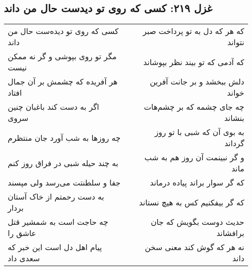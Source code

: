 \begin{center}
\section*{غزل ۲۱۹: کسی که روی تو دیدست حال من داند}
\label{sec:219}
\begin{longtable}{l p{0.5cm} r}
کسی که روی تو دیده‌ست حال من داند
&&
که هر که دل به تو پرداخت صبر نتواند
\\
مگر تو روی بپوشی و گر نه ممکن نیست
&&
که آدمی که تو بیند نظر بپوشاند
\\
هر آفریده که چشمش بر آن جمال افتاد
&&
دلش ببخشد و بر جانت آفرین خواند
\\
اگر به دست کند باغبان چنین سروی
&&
چه جای چشمه که بر چشم‌هات بنشاند
\\
چه روزها به شب آورد جان منتظرم
&&
به بوی آن که شبی با تو روز گرداند
\\
به چند حیله شبی در فراق روز کنم
&&
و گر نبینمت آن روز هم به شب ماند
\\
جفا و سلطنتت می‌رسد ولی مپسند
&&
که گر سوار براند پیاده درماند
\\
به دست رحمتم از خاک آستان بردار
&&
که گر بیفکنیم کس به هیچ نستاند
\\
چه حاجت است به شمشیر قتل عاشق را
&&
حدیث دوست بگویش که جان برافشاند
\\
پیام اهل دل است این خبر که سعدی داد
&&
نه هر که گوش کند معنی سخن داند
\\
\end{longtable}
\end{center}
